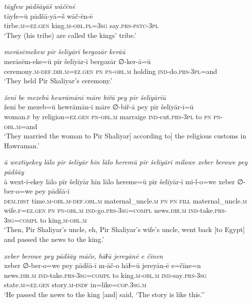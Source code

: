 \ea \label{ŽP.252}
\textit{tāyfew pādšāyāš wāčēnē} \\ 
\gll tāyfe=ū pādšā-yā=š wāč-ēn-ē \\ 
 tirbe\textsc{.m}\textsc{\textsc{=ez.gen}} king\textsc{.m}\textsc{-obl}\textsc{.pl}\textsc{=3sg} say\textsc{.prs-pstc-3pl} \\ 
\glt `They (his tribe) are called the kings’ tribe.'
\z 
 
\ea \label{ŽP.256}
\textit{merāsēmekew pīr šelīyārī bergozār kerāū} \\ 
\gll merāsēm-eke=ū pīr šelīyār-ī bergozār ∅-ker-ā=ū \\ 
 ceremony\textsc{.m}\textsc{-def}\textsc{.dir}\textsc{.m}\textsc{\textsc{=ez.gen}} \textsc{pn} \textsc{pn}\textsc{-obl}\textsc{.m} holding \textsc{ind-}do\textsc{.prs}\textsc{-3pl}=and \\ 
\glt `They held Pir Shaliyar’s ceremony.'
\z 
 
\ea \label{ŽP.257}
\textit{ženī be mezebū hewrāmānī māre biřā pey pīr šelīyārīū} \\ 
\gll ženī be mezeb=ū hewrāmān-ī māre ∅-biř-ā pey pīr šelīyār-ī=ū \\ 
 woman\textsc{.f} by religion\textsc{\textsc{=ez.gen}} \textsc{pn}\textsc{-obl}\textsc{.m} marraige \textsc{ind-}cut\textsc{.prs}\textsc{-3pl} to \textsc{pn} \textsc{pn}\textsc{-obl}\textsc{.m}=and \\ 
\glt `They married the woman to Pir Shaliyar] according to] the religious customs in Hawraman.'
\z 
 
\ea \label{ŽP.258}
\textit{ā wextīyekey lālo pīr šelīyār hīn lālo heremū pīr šelīyārī milowe xeber berowe pey pādšāy} \\ 
\gll ā wext-ī-ekey lālo pīr šelīyār hīn lālo hereme=ū pīr šelīyār-ī mi-l-o=we xeber ∅-ber-o=we pey pādšā-ī \\ 
 \textsc{dem.dist} time\textsc{.m}\textsc{-obl}\textsc{.m}\textsc{-def}\textsc{.obl}\textsc{.m} maternal\_uncle\textsc{.m} \textsc{pn} \textsc{pn} \textsc{fill} maternal\_uncle\textsc{.m} wife\textsc{.f}\textsc{\textsc{=ez.gen}} \textsc{pn} \textsc{pn}\textsc{-obl}\textsc{.m} \textsc{ind-}go\textsc{.prs}\textsc{-3sg}\textsc{=compl} news\textsc{.dir}\textsc{.m} \textsc{ind-}take\textsc{.prs}\textsc{-3sg}\textsc{=compl} to king\textsc{.m}\textsc{-obl}\textsc{.m} \\ 
\glt `Then, Pir Shaliyar’s uncle, eh, Pir Shaliyar’s wife’s uncle, went back [to Egypt] and passed the news to the king.'
\z 
 
\ea \label{ŽP.259}
\textit{xeber berowe pey pādšāy māčo, hāɫū jereyānē e čīnen} \\ 
\gll xeber ∅-ber-o=we pey pādšā-ī m-āč-o hāɫ=ū jereyān-ē e=čīne=n \\ 
 news\textsc{.dir}\textsc{.m} \textsc{ind-}take\textsc{.prs}\textsc{-3sg}\textsc{=compl} to king\textsc{.m}\textsc{-obl}\textsc{.m} \textsc{ind-}say\textsc{.prs}\textsc{-3sg} state\textsc{.m}\textsc{\textsc{=ez.gen}} story\textsc{.m}\textsc{-indf} in=like\textsc{=cop}\textsc{.3sg}\textsc{.m} \\ 
\glt `He passed the news to the king [and] said, ‘The story is like this.’'
\z 
 

